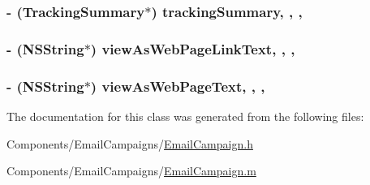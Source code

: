 \hypertarget{interface_email_campaign_a087ce0c24f9a20093302a430b4af0994}{
\subsubsection[{tracking\-Summary}]{\setlength{\rightskip}{0pt plus 5cm}-\/ ({\bf Tracking\-Summary}$\ast$) tracking\-Summary\hspace{0.3cm}{\ttfamily [read]}, {\ttfamily [write]}, {\ttfamily [nonatomic]}, {\ttfamily [strong]}}}\label{interface_email_campaign_a087ce0c24f9a20093302a430b4af0994}
\hypertarget{interface_email_campaign_a88af0c97288dafe250085fa07abfe248}{
\subsubsection[{view\-As\-Web\-Page\-Link\-Text}]{\setlength{\rightskip}{0pt plus 5cm}-\/ (N\-S\-String$\ast$) view\-As\-Web\-Page\-Link\-Text\hspace{0.3cm}{\ttfamily [read]}, {\ttfamily [write]}, {\ttfamily [nonatomic]}, {\ttfamily [strong]}}}\label{interface_email_campaign_a88af0c97288dafe250085fa07abfe248}
\hypertarget{interface_email_campaign_a1cc4071971230a238e0743074384e38a}{
\subsubsection[{view\-As\-Web\-Page\-Text}]{\setlength{\rightskip}{0pt plus 5cm}-\/ (N\-S\-String$\ast$) view\-As\-Web\-Page\-Text\hspace{0.3cm}{\ttfamily [read]}, {\ttfamily [write]}, {\ttfamily [nonatomic]}, {\ttfamily [strong]}}}\label{interface_email_campaign_a1cc4071971230a238e0743074384e38a}


The documentation for this class was generated from the following files\-:\begin{DoxyCompactItemize}
\item 
Components/\-Email\-Campaigns/\hyperlink{_email_campaign_8h}{Email\-Campaign.\-h}\item 
Components/\-Email\-Campaigns/\hyperlink{_email_campaign_8m}{Email\-Campaign.\-m}\end{DoxyCompactItemize}
